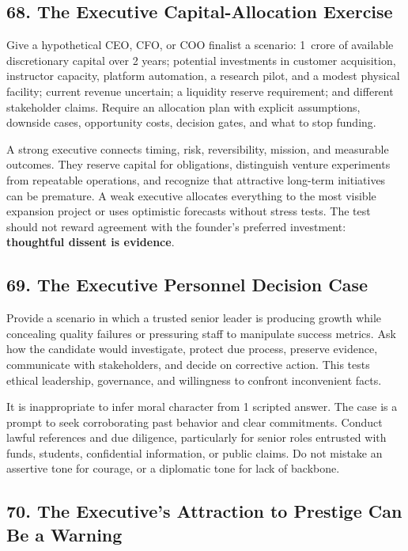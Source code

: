\subsection*{68. The Executive Capital-Allocation Exercise}

Give a hypothetical CEO, CFO, or COO finalist a scenario: 1~crore of available discretionary capital over 2 years; potential investments in customer acquisition, instructor capacity, platform automation, a research pilot, and a modest physical facility; current revenue uncertain; a liquidity reserve requirement; and different stakeholder claims. Require an allocation plan with explicit assumptions, downside cases, opportunity costs, decision gates, and what to stop funding.

A strong executive connects timing, risk, reversibility, mission, and measurable outcomes. They reserve capital for obligations, distinguish venture experiments from repeatable operations, and recognize that attractive long-term initiatives can be premature. A weak executive allocates everything to the most visible expansion project or uses optimistic forecasts without stress tests. The test should not reward agreement with the founder's preferred investment: \textbf{thoughtful dissent is evidence}.

\subsection*{69. The Executive Personnel Decision Case}

Provide a scenario in which a trusted senior leader is producing growth while concealing quality failures or pressuring staff to manipulate success metrics. Ask how the candidate would investigate, protect due process, preserve evidence, communicate with stakeholders, and decide on corrective action. This tests ethical leadership, governance, and willingness to confront inconvenient facts.

It is inappropriate to infer moral character from 1 scripted answer. The case is a prompt to seek corroborating past behavior and clear commitments. Conduct lawful references and due diligence, particularly for senior roles entrusted with funds, students, confidential information, or public claims. Do not mistake an assertive tone for courage, or a diplomatic tone for lack of backbone.

\subsection*{70. The Executive's Attraction to Prestige Can Be a Warning}

